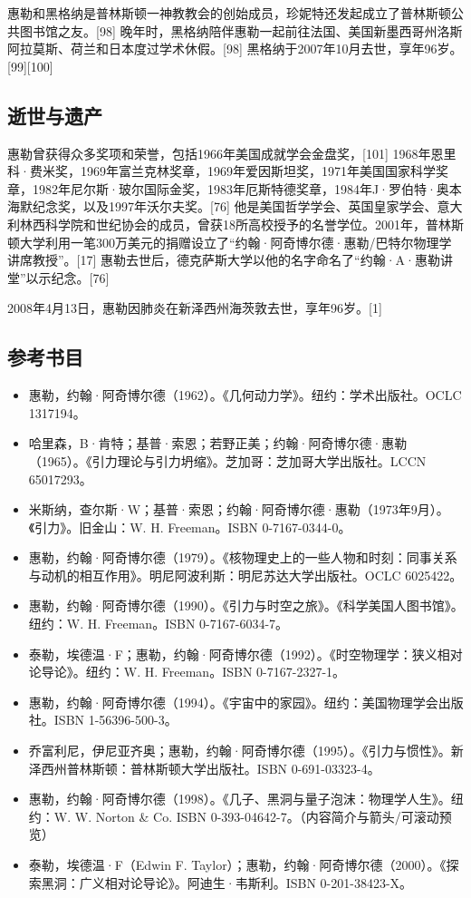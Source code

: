 惠勒和黑格纳是普林斯顿一神教教会的创始成员，珍妮特还发起成立了普林斯顿公共图书馆之友。[98] 晚年时，黑格纳陪伴惠勒一起前往法国、美国新墨西哥州洛斯阿拉莫斯、荷兰和日本度过学术休假。[98] 黑格纳于2007年10月去世，享年96岁。[99][100]
\subsection{逝世与遗产}
惠勒曾获得众多奖项和荣誉，包括1966年美国成就学会金盘奖，[101] 1968年恩里科·费米奖，1969年富兰克林奖章，1969年爱因斯坦奖，1971年美国国家科学奖章，1982年尼尔斯·玻尔国际金奖，1983年厄斯特德奖章，1984年J·罗伯特·奥本海默纪念奖，以及1997年沃尔夫奖。[76] 他是美国哲学学会、英国皇家学会、意大利林西科学院和世纪协会的成员，曾获18所高校授予的名誉学位。2001年，普林斯顿大学利用一笔300万美元的捐赠设立了“约翰·阿奇博尔德·惠勒/巴特尔物理学讲席教授”。[17] 惠勒去世后，德克萨斯大学以他的名字命名了“约翰·A·惠勒讲堂”以示纪念。[76]

2008年4月13日，惠勒因肺炎在新泽西州海茨敦去世，享年96岁。[1]
\subsection{参考书目}
\begin{itemize}
\item 惠勒，约翰·阿奇博尔德（1962）。《几何动力学》。纽约：学术出版社。OCLC 1317194。
\item 哈里森，B·肯特；基普·索恩；若野正美；约翰·阿奇博尔德·惠勒（1965）。《引力理论与引力坍缩》。芝加哥：芝加哥大学出版社。LCCN 65017293。
\item 米斯纳，查尔斯·W；基普·索恩；约翰·阿奇博尔德·惠勒（1973年9月）。《引力》。旧金山：W. H. Freeman。ISBN 0-7167-0344-0。
\item 惠勒，约翰·阿奇博尔德（1979）。《核物理史上的一些人物和时刻：同事关系与动机的相互作用》。明尼阿波利斯：明尼苏达大学出版社。OCLC 6025422。
\item 惠勒，约翰·阿奇博尔德（1990）。《引力与时空之旅》。《科学美国人图书馆》。纽约：W. H. Freeman。ISBN 0-7167-6034-7。
\item 泰勒，埃德温·F；惠勒，约翰·阿奇博尔德（1992）。《时空物理学：狭义相对论导论》。纽约：W. H. Freeman。ISBN 0-7167-2327-1。
\item 惠勒，约翰·阿奇博尔德（1994）。《宇宙中的家园》。纽约：美国物理学会出版社。ISBN 1-56396-500-3。
\item 乔富利尼，伊尼亚齐奥；惠勒，约翰·阿奇博尔德（1995）。《引力与惯性》。新泽西州普林斯顿：普林斯顿大学出版社。ISBN 0-691-03323-4。
\item 惠勒，约翰·阿奇博尔德（1998）。《几子、黑洞与量子泡沫：物理学人生》。纽约：W. W. Norton & Co. ISBN 0-393-04642-7。（内容简介与箭头/可滚动预览）
\item 泰勒，埃德温·F（Edwin F. Taylor）；惠勒，约翰·阿奇博尔德（2000）。《探索黑洞：广义相对论导论》。阿迪生·韦斯利。ISBN 0-201-38423-X。
\end{itemize}
